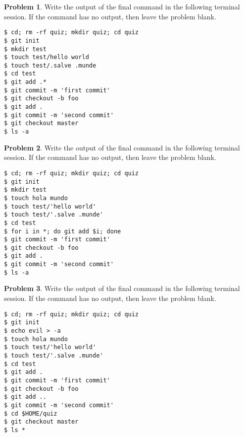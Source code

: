 \documentclass[10pt]{article}
\theoremstyle{definition}
\newtheorem{problem}{Problem}
\begin{document}
\filbreak
\begin{problem}
    Write the output of the final command in the following terminal session.
    If the command has no output, then leave the problem blank.
\end{problem}
\begin{lstlisting}
$ cd; rm -rf quiz; mkdir quiz; cd quiz
$ git init
$ mkdir test
$ touch test/hello world
$ touch test/.salve .munde
$ cd test
$ git add .*
$ git commit -m 'first commit'
$ git checkout -b foo
$ git add .
$ git commit -m 'second commit'
$ git checkout master
$ ls -a
\end{lstlisting}


\filbreak
\begin{problem}
    Write the output of the final command in the following terminal session.
    If the command has no output, then leave the problem blank.
\end{problem}
\begin{lstlisting}
$ cd; rm -rf quiz; mkdir quiz; cd quiz
$ git init
$ mkdir test
$ touch hola mundo
$ touch test/'hello world'
$ touch test/'.salve .munde'
$ cd test
$ for i in *; do git add $i; done
$ git commit -m 'first commit'
$ git checkout -b foo
$ git add .
$ git commit -m 'second commit'
$ ls -a
\end{lstlisting}

\filbreak
\begin{problem}
    Write the output of the final command in the following terminal session.
    If the command has no output, then leave the problem blank.
\end{problem}
\begin{lstlisting}
$ cd; rm -rf quiz; mkdir quiz; cd quiz
$ git init
$ echo evil > -a
$ touch hola mundo
$ touch test/'hello world'
$ touch test/'.salve .munde'
$ cd test
$ git add .
$ git commit -m 'first commit'
$ git checkout -b foo
$ git add ..
$ git commit -m 'second commit'
$ cd $HOME/quiz
$ git checkout master
$ ls *
\end{lstlisting}
\end{document}
